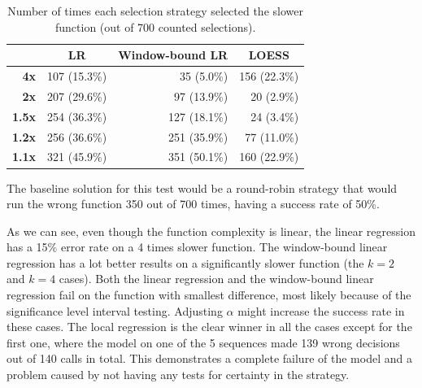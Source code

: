 \begin{table}[h!]
	\captionsetup{justification=centering,margin=0.5cm}
	\centering
	\bgroup
	\def\arraystretch{1.5}%
	\begin{tabular}{|r|r|r|r|}
		\hline
		\multicolumn{1}{|l|}{} & \multicolumn{1}{c|}{\textbf{LR}} & \multicolumn{1}{c|}{\textbf{Window-bound LR}} & \multicolumn{1}{c|}{\textbf{LOESS}} \\ \hline
		\textbf{4x}            & 107 (15.3\%)                     & 35 (5.0\%)                                    & 156 (22.3\%)                        \\ \hline
		\textbf{2x}            & 207 (29.6\%)                     & 97 (13.9\%)                                   & 20 (2.9\%)                          \\ \hline
		\textbf{1.5x}          & 254 (36.3\%)                     & 127 (18.1\%)                                  & 24 (3.4\%)                          \\ \hline
		\textbf{1.2x}          & 256 (36.6\%)                     & 251 (35.9\%)                                  & 77 (11.0\%)                         \\ \hline
		\textbf{1.1x}          & 321 (45.9\%)                     & 351 (50.1\%)                                  & 160 (22.9\%)                        \\ \hline
	\end{tabular}
	\egroup
	\caption{Number of times each selection strategy selected the slower function (out of 700 counted selections).}
	\label{tab:strategy_comparison}
\end{table}

The baseline solution for this test would be a round-robin strategy that would run the wrong function 350 out of 700 times, having a success rate of 50\%. 

As we can see, even though the function complexity is linear, the linear regression has a 15\% error rate on a 4 times slower function. The window-bound linear regression has a lot better results on a significantly slower function (the $k=2$ and $k=4$ cases). Both the linear regression and the window-bound linear regression fail on the function with smallest difference, most likely because of the significance level interval testing. Adjusting $\alpha$ might increase the success rate in these cases. The local regression is the clear winner in all the cases except for the first one, where the model on one of the 5 sequences made 139 wrong decisions out of 140 calls in total. This demonstrates a complete failure of the model and a problem caused by not having any tests for certainty in the strategy.

